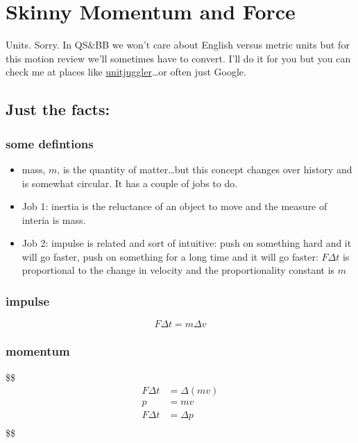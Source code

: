 \documentclass[
  letterpaper,
  DIV=11,
  numbers=noendperiod,
  oneside]{scrreprt}
\providecommand{\tightlist}{%
  \setlength{\itemsep}{0pt}\setlength{\parskip}{0pt}}\usepackage{longtable,booktabs,array}
\begin{document}
\chapter{Skinny Momentum and Force}\label{skinny-momentum-and-force}

Units. Sorry. In QS\&BB we won't care about English versus metric units
but for this motion review we'll sometimes have to convert. I'll do it
for you but you can check me at places like
\href{https://www.unitjuggler.com/index.html}{unitjuggler}\ldots or
often just Google.

\section{Just the facts:}\label{just-the-facts-1}

\subsection{some defintions}\label{some-defintions}

\begin{itemize}
\tightlist
\item
  mass, \(m\), is the quantity of matter\ldots but this concept changes
  over history and is somewhat circular. It has a couple of jobs to do.
\item
  Job 1: inertia is the reluctance of an object to move and the measure
  of interia is mass.
\item
  Job 2: impulse is related and sort of intuitive: push on something
  hard and it will go faster, push on something for a long time and it
  will go faster: \(F\Delta t\) is proportional to the change in
  velocity and the proportionality constant is \(m\)
\end{itemize}

\subsection{impulse}\label{impulse}

\[
\begin{equation}
F\Delta t = m\Delta v
\end{equation}
\]

\subsection{momentum}\label{momentum}

\$\$ \begin{align}
F\Delta t &= \Delta (mv) \nonumber \\
p &= mv \\
F\Delta t &= \Delta p \\

\end{align} \$\$
\end{document}

